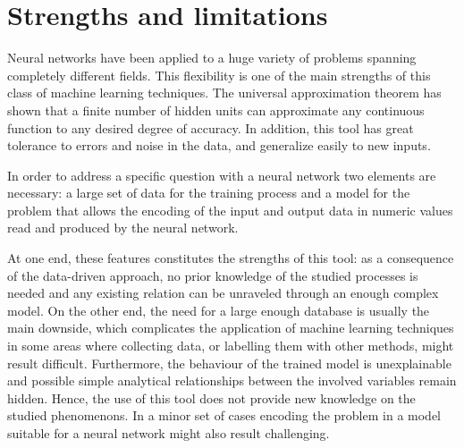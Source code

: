 \documentclass[a4paper,10pt]{report}
\begin{document}
\section{Strengths and limitations}

Neural networks have been applied to a huge variety of problems spanning completely different fields.
This flexibility is one of the main strengths of this class of machine learning techniques.
The universal approximation theorem has shown that 
a finite number of hidden units can approximate any continuous function to any desired degree of accuracy.
In addition, this tool has great tolerance to errors and noise in the data, and generalize easily to
new inputs.

In order to address a specific question with a neural network two elements are necessary:
a large set of data for the training process and a model for the problem that allows
the encoding of the input and output data in numeric values read and produced by the neural network.

At one end, these features constitutes the strengths of this tool:
as a consequence of the data-driven approach, no prior knowledge of
the studied processes is needed and any existing relation can be unraveled through
an enough complex model.
On the other end, the need for a large enough database is usually the main
downside, which complicates the application of machine learning techniques in some areas where
collecting data, or labelling them with other methods, might result difficult.
Furthermore, the behaviour of the trained model is unexplainable and 
possible simple analytical relationships between the involved variables remain hidden. 
Hence, the use of this tool does not provide new knowledge on the studied phenomenons.
In a minor set of cases encoding the problem in a model suitable for a neural network might also
result challenging.
\end{document}

